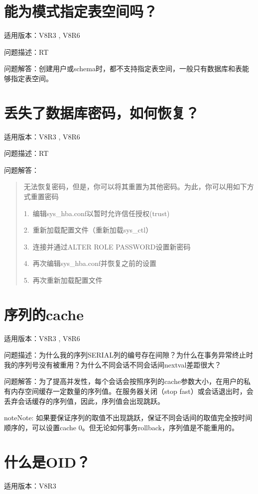 \documentclass[letterpaper,10pt,english]{sphinxmanual}
\begin{document}
\section{能为模式指定表空间吗？}
\label{\detokenize{sql:id13}}
适用版本：V8R3 , V8R6

问题描述：RT

问题解答：创建用户或schema时，都不支持指定表空间，一般只有数据库和表能够指定表空间。


\section{丢失了数据库密码，如何恢复？}
\label{\detokenize{sql:id14}}
适用版本：V8R3 , V8R6

问题描述：RT

问题解答：
\begin{quote}

无法恢复密码，但是，你可以将其重置为其他密码。为此，你可以用如下方式重置密码

1. 编辑sys\_hba.conf以暂时允许信任授权(trust)

2. 重新加载配置文件（重新加载sys\_ctl）

3. 连接并通过ALTER ROLE PASSWORD设置新密码

4. 再次编辑sys\_hba.conf并恢复之前的设置

5. 再次重新加载配置文件
\end{quote}


\section{序列的cache}
\label{\detokenize{sql:cache}}
适用版本：V8R3 , V8R6

问题描述：为什么我的序列SERIAL列的编号存在间隙？为什么在事务异常终止时我的序列号没有被重用？为什么不同会话不同会话间nextval差距很大？

问题解答：为了提高并发性，每个会话会按照序列的cache参数大小，在用户的私有内存空间缓存一定数量的序列值。在服务器关闭（stop fast）或会话退出时，会丢弃会话缓存的序列值，因此，序列值会出现跳跃。

\begin{sphinxadmonition}{note}{Note:}
如果要保证序列的取值不出现跳跃，保证不同会话间的取值完全按时间顺序的，可以设置cache 0。但无论如何事务rollback，序列值是不能重用的。
\end{sphinxadmonition}


\section{什么是OID？}
\label{\detokenize{sql:oid}}
适用版本：V8R3
\end{document}

